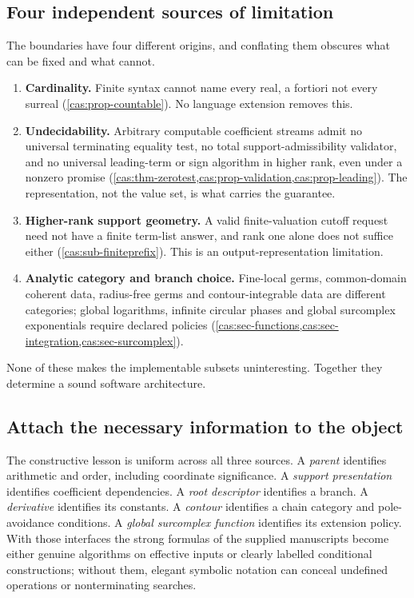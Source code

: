 \documentclass[11pt,letterpaper]{article}
\numberwithin{equation}{section}
\theoremstyle{definition}
\theoremstyle{remark}
\begin{document}
\subsection{Four independent sources of limitation}
\label{cas:sub-fourlimits}
The boundaries have four different origins, and conflating them obscures what
can be fixed and what cannot.
\begin{enumerate}
\item \textbf{Cardinality.} Finite syntax cannot name every real, a fortiori not
every surreal (\cref{cas:prop-countable}). No language extension removes this.
\item \textbf{Undecidability.} Arbitrary computable coefficient streams admit no
universal terminating equality test, no total support-admissibility validator,
and no universal leading-term or sign algorithm in higher rank, even under a
nonzero promise (\cref{cas:thm-zerotest,cas:prop-validation,cas:prop-leading}).
The representation, not the value set, is what carries the guarantee.
\item \textbf{Higher-rank support geometry.} A valid finite-valuation cutoff
request need not have a finite term-list answer, and rank one alone does not
suffice either (\cref{cas:sub-finiteprefix}). This is an output-representation
limitation.
\item \textbf{Analytic category and branch choice.} Fine-local germs,
common-domain coherent data, radius-free germs and contour-integrable data are
different categories; global logarithms, infinite circular phases and global
surcomplex exponentials require declared policies
(\cref{cas:sec-functions,cas:sec-integration,cas:sec-surcomplex}).
\end{enumerate}
None of these makes the implementable subsets uninteresting. Together they
determine a sound software architecture.

\subsection{Attach the necessary information to the object}
\label{cas:sub-attach}
The constructive lesson is uniform across all three sources. A \emph{parent}
identifies arithmetic and order, including coordinate significance. A
\emph{support presentation} identifies coefficient dependencies. A \emph{root
descriptor} identifies a branch. A \emph{derivative} identifies its constants. A
\emph{contour} identifies a chain category and pole-avoidance conditions. A
\emph{global surcomplex function} identifies its extension policy. With those
interfaces the strong formulas of the supplied manuscripts become either genuine
algorithms on effective inputs or clearly labelled conditional constructions;
without them, elegant symbolic notation can conceal undefined operations or
nonterminating searches.
\end{document}

